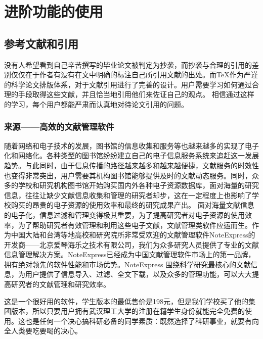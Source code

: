 \section{进阶功能的使用}
\subsection{参考文献和引用}
没有人希望看到自己辛苦撰写的毕业论文被判定为抄袭，而抄袭与合理的引用的差别仅仅在于作者有没有在文中明确的标注自己所引用文献的出处。而\TeX 作为严谨的科学论文排版体系，对于文献引用进行了完善的设计。用户需要学习如何通过合理的手段取得这些文献，并且恰当地引用他们来佐证自己的观点。
相信通过这样的学习，每个用户都能严肃而认真地对待论文引用的问题。
\subsubsection{来源——高效的文献管理软件}

随着网络和电子技术的发展，图书馆的信息收集和服务等也越来越多的实现了电子化和网络化。各种类型的图书馆纷纷建立自己的电子信息服务系统来追赶这一发展趋势。与此同时，由于信息传播的路径越来越多和越来越便捷，文献服务的时效性也变得非常突出，用户需要其机构图书馆能够提供及时的文献动态服务。同时，众多的学校和研究机构图书馆开始购买国内外各种电子资源数据库，面对海量的研究信息，往往让缺少文献信息收集和管理的研究者却步，这在一定程度上也影响了学校购买的昂贵的电子资源的使用效率和最终的研究成果产出。
面对海量文献信息的电子化，信息过滤和管理变得极其重要，为了提高研究者对电子资源的使用效率，为了帮助研究者有效管理和利用这些电子文献，文献管理类软件应运而生。作为中国大陆和台湾等地高校和研究院所非常受欢迎的文献管理软件NoteExpress的开发商——北京爱琴海乐之技术有限公司，我们为众多研究人员提供了专业的文献信息管理解决方案。NoteExpress已经成为中国文献管理软件市场上的第一品牌，拥有绝对领先的软件性能和市场优势。NoteExpress 围绕科学研究最核心的文献信息，为用户提供了信息导入、过滤、全文下载，以及众多的管理功能，可以大大提高研究者的文献管理和研究效率。

这是一个很好用的软件，学生版本的最低售价是198元，但是我们学校买了他的集团版本，所以只要用户拥有武汉理工大学的注册在籍学生身份就能完全免费的使用。这也是任何一个决心搞科研必备的同学素质：既然选择了科研事业，就要有向全人类要吃要喝的决心。
